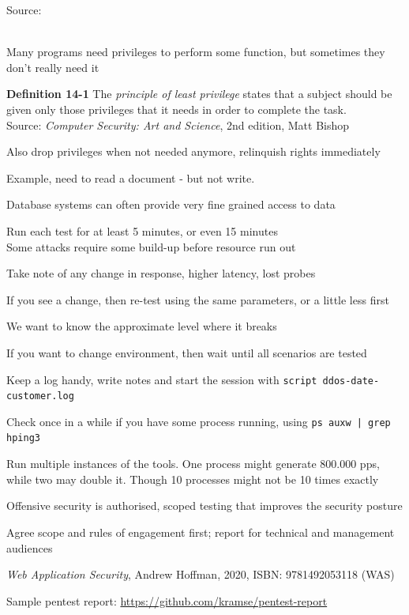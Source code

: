 \documentclass[Screen16to9,17pt]{foils}
\begin{document}
Source:\\
\\


\begin{list1}
\item Many programs need privileges to perform some function, but sometimes they don't really need it
\item {\bf Definition 14-1} The \emph{principle of least privilege} states that a subject should be given only those privileges that it needs in order to complete the task.\\
Source:  \emph{Computer Security: Art and Science}, 2nd edition, Matt Bishop

\item Also drop privileges when not needed anymore, relinquish rights immediately
\item Example, need to read a document - but not write.
\item Database systems can often provide very fine grained access to data
\end{list1}


\begin{list2}
\item Run each test for at least 5 minutes, or even 15 minutes\\
Some attacks require some build-up before resource run out
\item Take note of any change in response, higher latency, lost probes
\item If you see a change, then re-test using the same parameters, or a little less first
\item We want to know the approximate level where it breaks
\item If you want to change environment, then wait until all scenarios are tested
\item Keep a log handy, write notes and start the session with \verb+script ddos-date-customer.log+
\item Check once in a while if you have some process running, using \verb+ps auxw | grep hping3+
\item Run multiple instances of the tools. One process might generate 800.000 pps, while two may double it. Though 10 processes might not be 10 times exactly
\end{list2}

\begin{list2}
\item Offensive security is authorised, scoped testing that improves the security posture
\item Agree scope and rules of engagement first; report for technical and management audiences
\item \emph{Web Application Security}, Andrew Hoffman, 2020, ISBN: 9781492053118 (WAS)
\item Sample pentest report: \url{https://github.com/kramse/pentest-report}
\end{list2}
\end{document}

